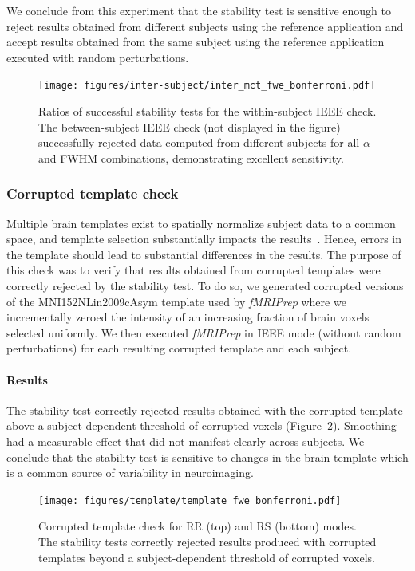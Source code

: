 \documentclass[lettersize,journal]{IEEEtran}
\newcommand{\fmriprep}{\emph{fMRIPrep}\xspace}
\begin{document}
{We conclude from this experiment that the stability test is sensitive enough to reject results obtained from different subjects using the reference application and accept results obtained from the same subject using the reference application executed with random perturbations.

\begin{figure}
  \centering
  \texttt{[image: figures/inter-subject/inter\_mct\_fwe\_bonferroni.pdf]}
  \caption{Ratios of successful stability tests for the within-subject IEEE check. The between-subject IEEE check (not displayed in the figure) successfully rejected data computed from different subjects for all $\alpha$ and FWHM combinations, demonstrating excellent sensitivity.
  }
  \label{fig:ieee-check}
\end{figure}

\subsubsection{Corrupted template check}
\label{subsec:template_check}

Multiple brain templates exist to spatially normalize subject data to a common space, and template selection substantially impacts the results~\cite{li2021moving}. Hence, errors in the template should lead to substantial differences in the results. The purpose of this check was to verify that results obtained from corrupted templates were correctly rejected by the stability test.
To do so, we generated corrupted versions of the MNI152NLin2009cAsym template used by \fmriprep where we incrementally zeroed the intensity of an increasing fraction of brain voxels selected uniformly. We then executed \fmriprep in IEEE mode (without random perturbations) for each resulting corrupted template and each subject.

\paragraph*{Results} The stability test correctly rejected results obtained with the corrupted template above a subject-dependent threshold of corrupted voxels (Figure~\ref{fig:template_bonferroni}). Smoothing had a measurable effect that did not manifest clearly across subjects. We conclude that the stability test is sensitive to changes in the brain template which is a common source of variability in neuroimaging.

\begin{figure}
  \centering
  \texttt{[image: figures/template/template\_fwe\_bonferroni.pdf]}
  \caption{Corrupted template check for RR (top) and RS (bottom) modes. The stability tests correctly rejected results produced with corrupted templates beyond a subject-dependent threshold of corrupted voxels.}
  \label{fig:template_bonferroni}
\end{figure}

}
\end{document}
